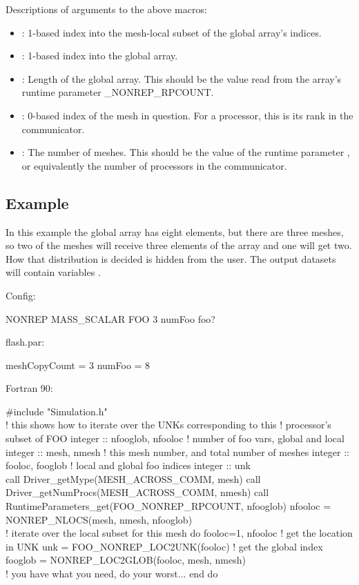 Descriptions of arguments to the above macros:
\begin{itemize}
\item {}:  1-based index into the mesh-local subset of the global array's indices.\\
\item {}:  1-based index into the global array.\\
\item {}:  Length of the global array.  This should be the value read from
the array's runtime parameter _NONREP_RPCOUNT.
\item {}:  0-based index of the mesh in question.  For a processor, this is
its rank in the  communicator.\\
\item {}:  The number of meshes.  This should be the value of the runtime parameter
, or equivalently the number of processors in the
 communicator.\\
\end{itemize}

\subsection{Example}
In this example the global array  has eight elements, but there are three meshes, so
two of the meshes will receive three elements of the array and one will get two.  How
that distribution is decided is hidden from the user.  The output datasets will contain
variables .

Config:
\begin{fcodeseg}
NONREP MASS_SCALAR FOO 3 numFoo foo?
\end{fcodeseg}

flash.par:
\begin{fcodeseg}
meshCopyCount = 3
numFoo = 8
\end{fcodeseg}

Fortran 90:
\begin{fcodeseg}
\#include "Simulation.h"\\
! this shows how to iterate over the UNKs corresponding to this 
! processor's subset of FOO
integer :: nfooglob, nfooloc ! number of foo vars, global and local
integer :: mesh, nmesh ! this mesh number, and total number of meshes
integer :: fooloc, fooglob ! local and global foo indices
integer :: unk\\
call Driver_getMype(MESH_ACROSS_COMM, mesh)
call Driver_getNumProcs(MESH_ACROSS_COMM, nmesh)
call RuntimeParameters_get(FOO_NONREP_RPCOUNT, nfooglob)
nfooloc = NONREP_NLOCS(mesh, nmesh, nfooglob)\\
! iterate over the local subset for this mesh
do fooloc=1, nfooloc
    ! get the location in UNK
    unk = FOO_NONREP_LOC2UNK(fooloc)
    ! get the global index
    fooglob = NONREP_LOC2GLOB(fooloc, mesh, nmesh)\\
    ! you have what you need, do your worst...
end do
\end{fcodeseg}

